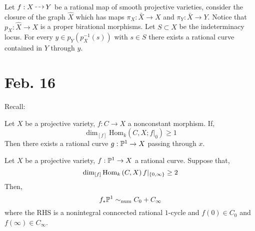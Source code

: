 \documentclass[12pt]{article}
\newcommand{\fixHom}[4]{\mathrm{Hom}_{#1} \left( #2, #3 ; #4 \right)}
\begin{document}
\begin{cor}
Let $f : X \rat Y$ be a rational map of smooth projective varieties, consider the closure of the graph $\hat{X}$ which has maps $\pi_X : \bar{X} \to X$ and $\pi_Y : \bar{X} \to Y$. Notice that $p_X : \hat{X} \to X$ is a proper birational morphisms. Let $S \subset X$ be the indeterminacy locus. For every $y \in p_Y(p_X^{-1}(s))$ with $s \in S$ there exists a rational curve contained in $Y$ through $y$. 
\end{cor} 

\section{Feb. 16}

Recall:

\begin{thm} 
Let $X$ be a projective variety, $f : C \to X$ a nonconstant morphism. If,
\[ \dim_{[f]} \fixHom{k}{C}{X}{f|_{0}} \ge 1 \]
Then there exists a rational curve $g : \P^1 \to X$ passing through $x$.
\end{thm}

\begin{thm}
Let $X$ be a projective variety, $f : \P^1 \to X$ a rational curve. Suppose that,
 \[ \dim_{[f]} \Hom{k}{C}{X}{f|_{\{0,\infty\}}} \ge 2 \]
Then,
 \[ f_* \P^1 \sim_{\text{num}} C_0 + C_\infty \]
where the RHS is a nonintegral conncected rational $1$-cycle and $f(0) \in C_0$ and $f(\infty) \in C_\infty$. 
\end{thm}
\end{document}
